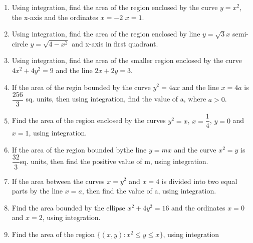 \begin{enumerate}
\item Using integration, find the area of the region enclosed by the curve $ y=x^2 $, the x-axis and the ordinates $x=-2$  $x=1$.

\item Using integration, find the area of the region enclosed by line $y=\sqrt{3}x$ semi-circle $y=\sqrt{4-x^2}$ and x-axis in first quadrant.

\item Using integration, find the area of the smaller region enclosed by the curve ${4x^2 + 4y^2} = 9$ and the line $2x + 2y =3$.

\item If the area of the regin bounded by the curve $y^2 = 4ax$ and the line $x = 4a$ is $\dfrac{256}{3}$\hspace{0.2cm} sq. units, then using integration, find the value of a, where $a>0$.

\item Find the area of the region enclosed by the curves $y^2=x$, $x=\dfrac{1}{4}$,  $y=0$ and $x=1$, using integration.

\item If the area of the region bounded bythe line $y=mx$ and the curve $x^2=y$ is $\dfrac{32}{3}$\hspace{0.2cm}sq. units, then find the positive value of m, using integration.

\item If the area between the curves $x = y^2$ and $x = 4$ is divided into two equal parts by the line $x = a$, then find the value of a, using integration.

\item Find the area bounded by the ellipse $x^2+4y^2=16$ and the ordinates $x=0$ and $x=2$, using integration.

\item Find the area of the region $\{(x,y) : x^2 \leq y \leq x\}$, using integration

\end{enumerate}
